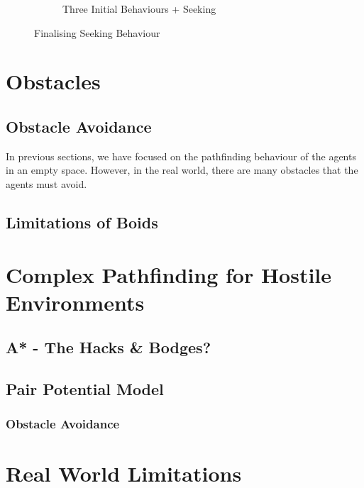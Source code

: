\documentclass{article}
\begin{document}
\begin{figure}[H]
\begin{subfigure}{.45\textwidth}
\caption{Three Initial Behaviours + Seeking}
\label{fig:exp7}
\end{subfigure}
\caption{Finalising Seeking Behaviour}
\label{fig:exp67}
\end{figure}

\section{Obstacles}
\subsection{Obstacle Avoidance}
In previous sections, we have focused on the pathfinding behaviour of the agents in an empty space. However, in the real world, there are many obstacles that the agents must avoid. 

\subsection{Limitations of Boids}

\section{Complex Pathfinding for Hostile Environments}
\label{sec:complex-pathfinding}
\subsection{A* - The Hacks \& Bodges?}

\subsection{Pair Potential Model}

\subsubsection{Obstacle Avoidance}

\section{Real World Limitations}
\end{document}
